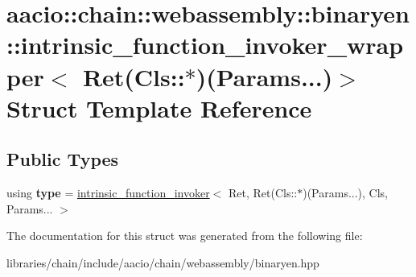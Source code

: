 \hypertarget{structaacio_1_1chain_1_1webassembly_1_1binaryen_1_1intrinsic__function__invoker__wrapper_3_01_reae18afa02f6a4417d269a4739bb748cd}{}\section{aacio\+:\+:chain\+:\+:webassembly\+:\+:binaryen\+:\+:intrinsic\+\_\+function\+\_\+invoker\+\_\+wrapper$<$ Ret(Cls\+:\+:$\ast$)(Params...)$>$ Struct Template Reference}
\label{structaacio_1_1chain_1_1webassembly_1_1binaryen_1_1intrinsic__function__invoker__wrapper_3_01_reae18afa02f6a4417d269a4739bb748cd}
\subsection*{Public Types}
\begin{DoxyCompactItemize}
\item 
\mbox{\label{structaacio_1_1chain_1_1webassembly_1_1binaryen_1_1intrinsic__function__invoker__wrapper_3_01_reae18afa02f6a4417d269a4739bb748cd_a8983ef0dc8f3dc441b0e76e65bb49607}} 
using {\bfseries type} = \mbox{\hyperlink{structaacio_1_1chain_1_1webassembly_1_1binaryen_1_1intrinsic__function__invoker}{intrinsic\+\_\+function\+\_\+invoker}}$<$ Ret, Ret(Cls\+::$\ast$)(Params...), Cls, Params... $>$
\end{DoxyCompactItemize}


The documentation for this struct was generated from the following file\+:\begin{DoxyCompactItemize}
\item 
libraries/chain/include/aacio/chain/webassembly/binaryen.\+hpp\end{DoxyCompactItemize}
